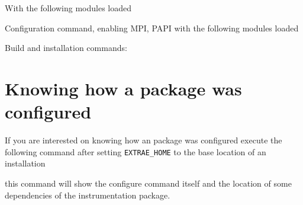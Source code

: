 With the following modules loaded


Configuration command, enabling MPI, PAPI with the following modules loaded


Build and installation commands:



\section{Knowing how a package was configured}

If you are interested on knowing how an \TRACE package was configured execute the following command after setting {\tt EXTRAE\_HOME} to the base location of an installation


this command will show the configure command itself and the location of some dependencies of the instrumentation package.
